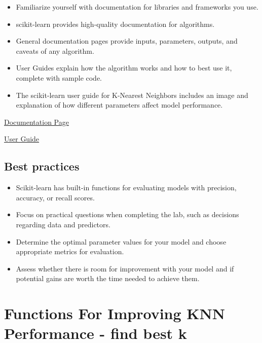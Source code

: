 \documentclass[11pt]{article}
\providecommand{\tightlist}{%
      \setlength{\itemsep}{0pt}\setlength{\parskip}{0pt}}
\begin{document}
\begin{itemize}
\tightlist
\item
  Familiarize yourself with documentation for libraries and frameworks
  you use.
\item
  scikit-learn provides high-quality documentation for algorithms.
\item
  General documentation pages provide inputs, parameters, outputs, and
  caveats of any algorithm.
\item
  User Guides explain how the algorithm works and how to best use it,
  complete with sample code.
\item
  The scikit-learn user guide for K-Nearest Neighbors includes an image
  and explanation of how different parameters affect model performance.
\end{itemize}

\href{https://scikit-learn.org/stable/modules/generated/sklearn.neighbors.KNeighborsClassifier.html}{Documentation
Page}

\href{https://scikit-learn.org/stable/modules/neighbors.html\#classification}{User
Guide}

\hypertarget{best-practices}{%
\subsection{Best practices}\label{best-practices}}

\begin{itemize}
\tightlist
\item
  Scikit-learn has built-in functions for evaluating models with
  precision, accuracy, or recall scores.
\item
  Focus on practical questions when completing the lab, such as
  decisions regarding data and predictors.
\item
  Determine the optimal parameter values for your model and choose
  appropriate metrics for evaluation.
\item
  Assess whether there is room for improvement with your model and if
  potential gains are worth the time needed to achieve them.
\end{itemize}

    \hypertarget{functions-for-improving-knn-performance---find-best-k}{%
\section{Functions For Improving KNN Performance - find best
k}\label{functions-for-improving-knn-performance---find-best-k}}
\end{document}
